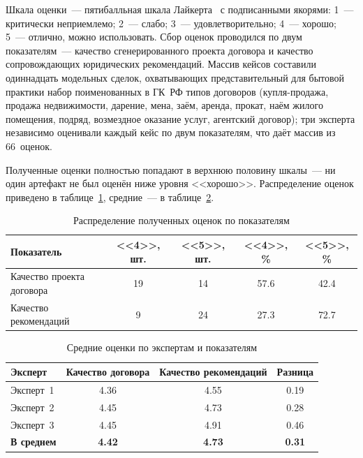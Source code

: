 Шкала оценки~--- пятибалльная шкала Лайкерта~\cite{likert1932} с подписанными якорями: 1~--- критически неприемлемо; 2~--- слабо; 3~--- удовлетворительно; 4~--- хорошо; 5~--- отлично, можно использовать. Сбор оценок проводился по двум показателям~--- качество сгенерированного проекта договора и качество сопровождающих юридических рекомендаций. Массив кейсов составили одиннадцать модельных сделок, охватывающих представительный для бытовой практики набор поименованных в ГК~РФ типов договоров (купля-продажа, продажа недвижимости, дарение, мена, заём, аренда, прокат, наём жилого помещения, подряд, возмездное оказание услуг, агентский договор); три эксперта независимо оценивали каждый кейс по двум показателям, что даёт массив из 66~оценок.

Полученные оценки полностью попадают в верхнюю половину шкалы~--- ни один артефакт не был оценён ниже уровня <<хорошо>>. Распределение оценок приведено в таблице~\ref{tab:expert-distribution}, средние~--- в таблице~\ref{tab:expert-means}.

\begin{table}[H]
\caption{Распределение полученных оценок по показателям}
\label{tab:expert-distribution}
\renewcommand{\arraystretch}{1.20}
\begin{tabularx}{\textwidth}{|>{\raggedright\arraybackslash}X|c|c|c|c|} \hline
\textbf{Показатель} & \textbf{<<4>>, шт.} & \textbf{<<5>>, шт.} & \textbf{<<4>>, \%} & \textbf{<<5>>, \%} \\ \hline
Качество проекта договора & 19 & 14 & 57.6 & 42.4 \\ \hline
Качество рекомендаций & 9 & 24 & 27.3 & 72.7 \\ \hline
\end{tabularx}
\end{table}

\begin{table}[H]
\caption{Средние оценки по экспертам и показателям}
\label{tab:expert-means}
\renewcommand{\arraystretch}{1.20}
\begin{tabularx}{\textwidth}{|>{\raggedright\arraybackslash}X|c|c|c|} \hline
\textbf{Эксперт} & \textbf{Качество договора} & \textbf{Качество рекомендаций} & \textbf{Разница} \\ \hline
Эксперт~1 & 4.36 & 4.55 & 0.19 \\ \hline
Эксперт~2 & 4.45 & 4.73 & 0.28 \\ \hline
Эксперт~3 & 4.45 & 4.91 & 0.46 \\ \hline
\textbf{В среднем} & \textbf{4.42} & \textbf{4.73} & \textbf{0.31} \\ \hline
\end{tabularx}
\end{table}

